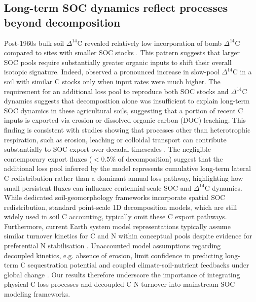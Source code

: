\documentclass[bg, manuscript]{copernicus}
\begin{document}
\subsection{Long-term SOC dynamics reflect processes beyond decomposition}
Post-1960s bulk soil $\Delta^{14}\text{C}$ revealed relatively low incorporation of bomb $\Delta^{14}\text{C}$ compared to sites with smaller SOC stocks \citep{Baisden2013, Stoner2021}. This pattern suggests that larger SOC pools require substantially greater organic inputs to shift their overall isotopic signature. Indeed, \citet{Mills2014} observed a pronounced increase in slow-pool $\Delta^{14}\text{C}$ in a soil with similar C stocks only when input rates were much higher. The requirement for an additional loss pool to reproduce both SOC stocks and $\Delta^{14}\text{C}$ dynamics suggests that decomposition alone was insufficient to explain long-term SOC dynamics in these agricultural soils, suggesting that a portion of recent C inputs is exported via erosion or dissolved organic carbon (DOC) leaching. This finding is consistent with studies showing that processes other than heterotrophic respiration, such as erosion, leaching or colloidal transport can contribute substantially to SOC export over decadal timescales \citep{Berhe2012, Doetterl2016, Quinton2010}. The negligible contemporary export fluxes ($< 0.5\%$ of decomposition) suggest that the additional loss pool inferred by the model represents cumulative long-term lateral C redistribution rather than a dominant annual loss pathway, highlighting how small persistent fluxes can influence centennial-scale SOC and $\Delta^{14}\text{C}$ dynamics. While dedicated soil-geomorphology frameworks incorporate spatial SOC redistribution, standard point-scale 1D decomposition models, which are still widely used in soil C accounting, typically omit these C export pathways. Furthermore, current Earth system model representations typically assume similar turnover kinetics for C and N within conceptual pools despite evidence for preferential N stabilisation \citep{Spohn2024, Koven2013}. Unaccounted model assumptions regarding decoupled kinetics, e.g. absence of erosion, limit confidence in predicting long-term C sequestration potential and coupled climate-soil-nutrient feedbacks under global change \citep{Luo2004, Yu2024, GonzalezSosa2024}. Our results therefore underscore the importance of integrating physical C loss processes and decoupled C-N turnover into mainstream SOC modeling frameworks.
\end{document}
